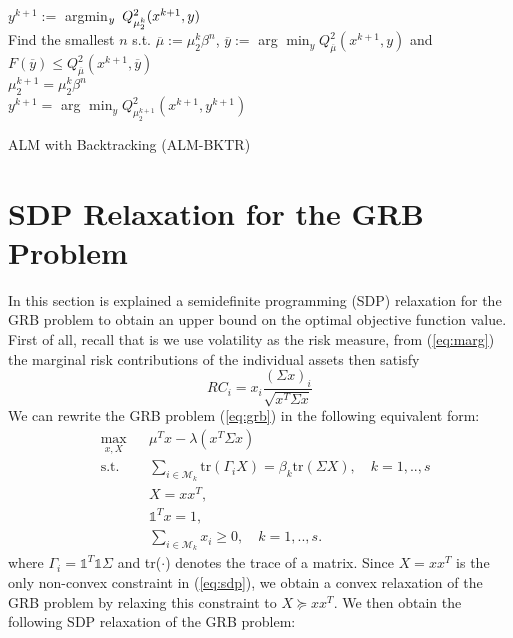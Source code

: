 {\begin{algorithm}
{$y^{k+1} :=$ argmin$_y \hspace{0.5em} Q^2_{\mu_2^k}(x^{k+1},y)$\\
{
Find the smallest $n$ s.t. $\overline{\mu} := \mu_2^k\beta^n$,  $\overline{y}:=$ arg $\min_y Q^2_{\overline{\mu}}(x^{k+1},y)$ and $F(\overline{y}) \leq Q^2_{\overline{\mu}}(x^{k+1},\overline{y})$\\
$\mu_2^{k+1} = \mu_2^k \beta^n$\\
$y^{k+1} =$  arg $\min_y Q^2_{\mu_2^{k+1}}(x^{k+1},y^{k+1})$
}
}
\caption{ALM with Backtracking (ALM-BKTR)}
\label{alg:almbktr}
\end{algorithm}


\section{SDP Relaxation for the GRB Problem}
In this section is explained a semidefinite programming (SDP) relaxation for the GRB problem to obtain an upper bound on the optimal objective function value. First of all, recall that is we use volatility as the risk measure, from (\ref{eq:marg}) the marginal risk contributions of the individual assets then satisfy
\begin{equation}
RC_i= x_i \frac{(\Sigma x)_i}{\sqrt{x^T \Sigma x}}
\end{equation}
We can rewrite the GRB problem (\ref{eq:grb}) in the following equivalent form:
\begin{equation}\label{eq:sdp}
\begin{aligned}
& \underset{x,X}{\text{max}}
& & \mu^Tx - \lambda(x^T\Sigma x) \\
& \text{s.t.}
&& \sum_{i \in \mathcal{M}_k} \mbox{tr}(\Gamma_i X) = \beta_k \mbox{tr}(\Sigma X), \quad k=1,..,s \\
&&&X = xx^T,\\
&&&\mathds{1}^T x = 1,\\
&&&\sum_{i \in \mathcal{M}_k} x_i \geq 0, \quad k=1,..,s.
\end{aligned}
\end{equation}
where $\Gamma_i = \mathds{1}^T \mathds{1} \Sigma$ and tr($\cdot$) denotes the trace of a matrix. Since $X = x x^T$ is the only non-convex constraint in (\ref{eq:sdp}), we obtain a convex relaxation of the GRB problem by relaxing this constraint to $X \succeq  x x^T$. We then obtain the following SDP relaxation of the GRB problem:
\begin{equation}

\end{equation}}
